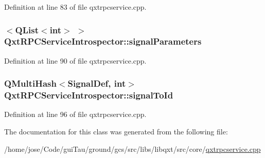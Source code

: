 Definition at line 83 of file qxtrpcservice.\-cpp.

\hypertarget{class_qxt_r_p_c_service_introspector_a36a02e28ea7197c8fec17dda6b17da30}{
\subsubsection[{signal\-Parameters}]{$<${\bf Q\-List}$<${\bf int}$>$ $>$ Qxt\-R\-P\-C\-Service\-Introspector\-::signal\-Parameters}}\label{class_qxt_r_p_c_service_introspector_a36a02e28ea7197c8fec17dda6b17da30}


Definition at line 90 of file qxtrpcservice.\-cpp.

\hypertarget{class_qxt_r_p_c_service_introspector_a92dae8f5cfca0f2427820c7fbc0bb805}{
\subsubsection[{signal\-To\-Id}]{\setlength{\rightskip}{0pt plus 5cm}Q\-Multi\-Hash$<${\bf Signal\-Def}, {\bf int}$>$ Qxt\-R\-P\-C\-Service\-Introspector\-::signal\-To\-Id}}\label{class_qxt_r_p_c_service_introspector_a92dae8f5cfca0f2427820c7fbc0bb805}


Definition at line 96 of file qxtrpcservice.\-cpp.



The documentation for this class was generated from the following file\-:\begin{DoxyCompactItemize}
\item 
/home/jose/\-Code/gui\-Tau/ground/gcs/src/libs/libqxt/src/core/\hyperlink{qxtrpcservice_8cpp}{qxtrpcservice.\-cpp}\end{DoxyCompactItemize}
